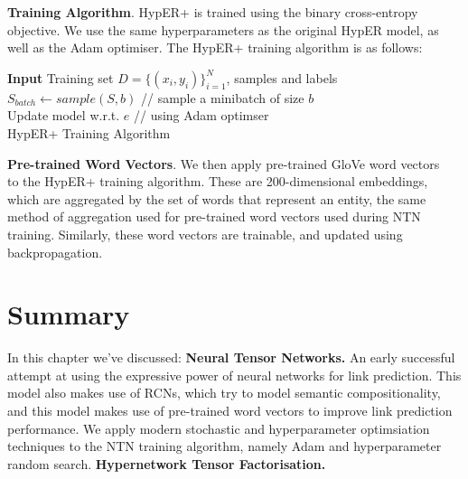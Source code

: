 \textbf{Training Algorithm}. HypER+ is trained using the binary cross-entropy objective. We use the same hyperparameters as the original HypER model, as well as the Adam optimiser. The HypER+ training algorithm is as follows: \newline

\begin{algorithm}[H]
	\SetAlgoLined
	\textbf{Input} 
	Training set \begin{math} D = \{(x_i, y_i)\}_{i=1}^N \end{math}, samples and labels\;
  	\begin{math} S_{batch} \gets sample(S, b) \end{math} // sample a minibatch of size \begin{math} b \end{math} \\
	Update model w.r.t. \begin{math}  e \end{math} // using Adam optimser \\
	\caption{HypER+ Training Algorithm}
\end{algorithm} \bigskip
 \bigskip
 
\textbf{Pre-trained Word Vectors}. We then apply pre-trained GloVe word vectors ~\citep{pennington2014glove} to the HypER+ training algorithm. These are 200-dimensional embeddings, which are aggregated by the set of words that represent an entity, the same method of aggregation used for pre-trained word vectors used during NTN training. Similarly, these word vectors are trainable, and updated using backpropagation. 



\section{Summary}

In this chapter we've discussed: \newline
\textbf{Neural Tensor Networks.} An early successful attempt at using the expressive power of neural networks for link prediction. This model also makes use of RCNs, which try to model semantic compositionality, and this model makes use of pre-trained word vectors to improve link prediction performance. We apply modern stochastic and hyperparameter optimsiation techniques to the NTN training algorithm, namely Adam and hyperparameter random search. \newline
\textbf{Hypernetwork Tensor Factorisation.}  \newline

